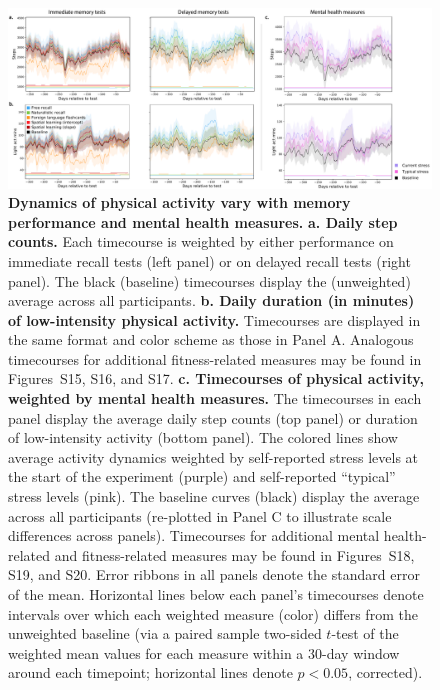 \documentclass[10pt]{article}
\newcommand{\activityTimecourse}{S15}
\newcommand{\cardioTimecourse}{S16}
\newcommand{\sleepTimecourse}{S17}
\newcommand{\activityTimecourseMH}{S18}
\newcommand{\cardioTimecourseMH}{S19}
\newcommand{\sleepTimecourseMH}{S20}
\begin{document}
\begin{figure}[tp]
\centering
\includegraphics[width=\textwidth]{figs/weighted_timecourse_summary}
\caption{\textbf{Dynamics of physical activity vary with memory
    performance and mental health measures.}  \textbf{a. Daily step counts.}  Each
  timecourse is weighted by either performance on immediate recall tests
  (left panel) or on delayed recall tests (right panel).  The black
  (baseline) timecourses display the (unweighted) average across all
  participants.  \textbf{b. Daily duration (in minutes) of low-intensity physical
    activity.}  Timecourses are displayed in the same format and color
scheme as those in Panel A.  Analogous timecourses for additional
fitness-related measures may be found in Figures~\activityTimecourse,
\cardioTimecourse, and \sleepTimecourse.  \textbf{c. Timecourses of physical
  activity, weighted by mental health measures.}  The timecourses in
each panel display the average daily step counts (top panel) or
duration of low-intensity activity (bottom panel).  The colored lines
show average activity dynamics weighted by self-reported stress levels
at the start of the experiment (purple) and self-reported ``typical''
stress levels (pink).  The baseline curves (black) display the
average across all participants (re-plotted in Panel C to illustrate
scale differences across panels).  Timecourses for additional mental
health-related and fitness-related measures may be found in
Figures~\activityTimecourseMH, \cardioTimecourseMH, and \sleepTimecourseMH. Error ribbons in all panels denote
the standard error of the mean.  Horizontal lines below each panel's
timecourses denote intervals over which each weighted measure (color) differs
from the unweighted baseline (via a paired sample two-sided $t$-test
of the weighted mean values for each measure within a 30-day window around each timepoint; horizontal lines denote $p <
0.05$, corrected).}
\label{fig:dynamics}
\end{figure}
\end{document}
